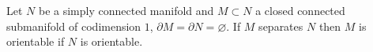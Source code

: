 Let $N$ be a simply connected manifold and $M \subset N$ a closed connected submanifold of codimension $1$, $\partial M = \partial N = \varnothing$. If $M$ separates $N$ then $M$ is orientable if $N$ is orientable.
